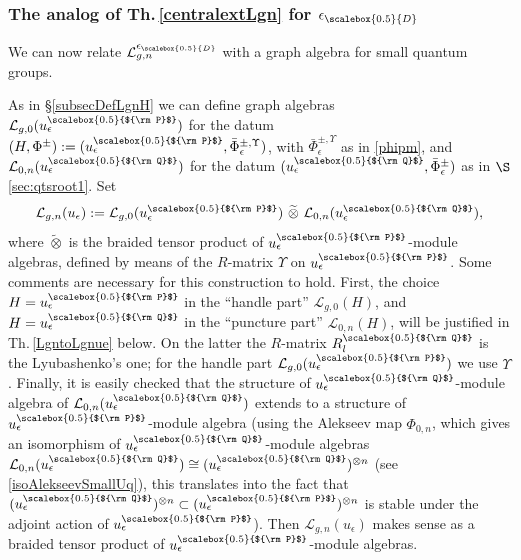 \documentclass[11pt]{amsart}
\newcommand{\e}{\epsilon}
\newcommand{\eD}{\epsilon_{\scalebox{0.5}{D}}}
\newcommand{\Q}{{\scalebox{0.5}{${\rm Q}$}}}
\newcommand{\Pup}{{\scalebox{0.5}{${\rm P}$}}}
\begin{document}
\subsubsection{The analog of Th.\,\ref{centralextLgn} for $\eD$}\label{sec:analogextfev26} We can now relate $\mathcal{L}_{g,n}^{\eD}$ with a graph algebra for small quantum groups.

As in \S \ref{subsecDefLgnH} we can define graph algebras $\mathcal{L}_{g,0}(u_\e^\Pup)$ for the datum $(H,\Phi^\pm) := (u_\epsilon^\Pup,\bar\Phi_\e^{\pm,\Upsilon})$, with $\bar\Phi_\e^{\pm,\Upsilon}$  as in \eqref{phipm}, and $\mathcal{L}_{0,n}(u_\e^\Q)$ for the datum $(u_\epsilon^\Q,\bar\Phi_\e^{\pm})$ as in $\S$\ref{sec:qtsroot1}. Set
\begin{equation}\label{defLgnueRlp}
\mathcal{L}_{g,n}(u_\e) := \mathcal{L}_{g,0}(u_\e^\Pup)\ \widetilde{\otimes}\ \mathcal{L}_{0,n}(u_\e^\Q),
\end{equation}
where $\widetilde{\otimes}$ is the braided tensor product of $u_\e^\Pup$-module algebras, defined by means of the $R$-matrix $\Upsilon$ on $u_\e^\Pup$. Some comments are necessary for this construction to hold. First, the choice $H=u_\e^\Pup$ in the ``handle part'' $\mathcal{L}_{g,0}(H)$, and $H=u_\e^\Q$ in the ``puncture part'' $\mathcal{L}_{0,n}(H)$, will be justified in Th.\,\ref{LgntoLgnue} below. On the latter the $R$-matrix $R_l^\Q$ is the Lyubashenko's one; for the handle part $\mathcal{L}_{g,0}(u_\e^\Pup)$ we use $\Upsilon$. Finally, it is easily checked that the structure of $u_\e^\Q$-module algebra of $\mathcal{L}_{0,n}(u_\e^\Q)$ extends to a structure of $u_\e^\Pup$-module algebra (using the Alekseev map $\Phi_{0,n}$, which gives an isomorphism of $u_\e^\Q$-module algebras $\mathcal{L}_{0,n}(u_\e^\Q) \cong (u_\e^\Q)^{\otimes n}$ (see \eqref{isoAlekseevSmallUq}), this translates into the fact that $(u_\e^\Q)^{\otimes n}\subset (u_\e^\Pup)^{\otimes n}$ is stable under the adjoint action of $u_\e^\Pup$). Then $\mathcal{L}_{g,n}(u_\e)$ makes sense as a braided tensor product of $u_\e^\Pup$-module algebras.
\smallskip
\end{document}
